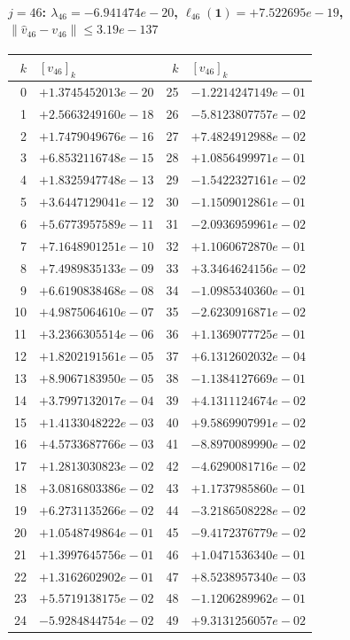 \documentclass[11pt]{article}
\begin{document}
\paragraph{$j = 46$: $\lambda_{46} = -6.941474e-20$, \quad $\ell_{46}(\mathbf{1}) = +7.522695e-19$, \quad $\|\hat v_{46} - v_{46}\| \leq 3.19e-137$}
\begin{center}
{\footnotesize
\begin{tabular}{r@{\;\;}l@{\quad}r@{\;\;}l}
\toprule
$k$ & $[v_{46}]_k$ & $k$ & $[v_{46}]_k$ \\
\midrule
0 & $+1.3745452013e-20$ & 25 & $-1.2214247149e-01$ \\
1 & $+2.5663249160e-18$ & 26 & $-5.8123807757e-02$ \\
2 & $+1.7479049676e-16$ & 27 & $+7.4824912988e-02$ \\
3 & $+6.8532116748e-15$ & 28 & $+1.0856499971e-01$ \\
4 & $+1.8325947748e-13$ & 29 & $-1.5422327161e-02$ \\
5 & $+3.6447129041e-12$ & 30 & $-1.1509012861e-01$ \\
6 & $+5.6773957589e-11$ & 31 & $-2.0936959961e-02$ \\
7 & $+7.1648901251e-10$ & 32 & $+1.1060672870e-01$ \\
8 & $+7.4989835133e-09$ & 33 & $+3.3464624156e-02$ \\
9 & $+6.6190838468e-08$ & 34 & $-1.0985340360e-01$ \\
10 & $+4.9875064610e-07$ & 35 & $-2.6230916871e-02$ \\
11 & $+3.2366305514e-06$ & 36 & $+1.1369077725e-01$ \\
12 & $+1.8202191561e-05$ & 37 & $+6.1312602032e-04$ \\
13 & $+8.9067183950e-05$ & 38 & $-1.1384127669e-01$ \\
14 & $+3.7997132017e-04$ & 39 & $+4.1311124674e-02$ \\
15 & $+1.4133048222e-03$ & 40 & $+9.5869907991e-02$ \\
16 & $+4.5733687766e-03$ & 41 & $-8.8970089990e-02$ \\
17 & $+1.2813030823e-02$ & 42 & $-4.6290081716e-02$ \\
18 & $+3.0816803386e-02$ & 43 & $+1.1737985860e-01$ \\
19 & $+6.2731135266e-02$ & 44 & $-3.2186508228e-02$ \\
20 & $+1.0548749864e-01$ & 45 & $-9.4172376779e-02$ \\
21 & $+1.3997645756e-01$ & 46 & $+1.0471536340e-01$ \\
22 & $+1.3162602902e-01$ & 47 & $+8.5238957340e-03$ \\
23 & $+5.5719138175e-02$ & 48 & $-1.1206289962e-01$ \\
24 & $-5.9284844754e-02$ & 49 & $+9.3131256057e-02$ \\
\bottomrule
\end{tabular}
}
\end{center}
\end{document}
